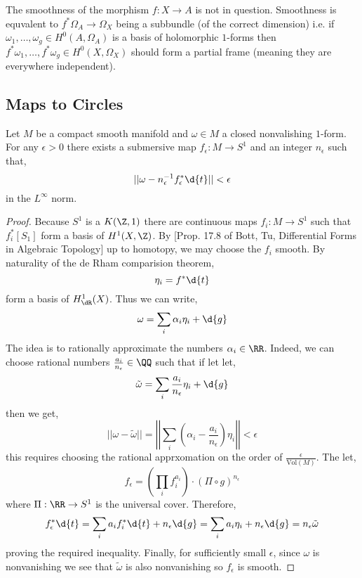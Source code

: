 \documentclass[12pt]{article}
\begin{document}
The smoothness of the morphism $f : X \to A$ is not in question. Smoothness is equvalent to $f^* \Omega_A \to \Omega_X$ being a subbundle (of the correct dimension) i.e. if $\omega_1, \dots, \omega_g \in H^0(A, \Omega_A)$ is a basis of holomorphic $1$-forms then $f^* \omega_1, \dots, f^* \omega_g \in H^0(X, \Omega_X)$ should form a partial frame (meaning they are everywhere independent). 


\subsection{Maps to Circles}

\begin{prop}
Let $M$ be a compact smooth manifold and $\omega \in M$ a closed nonvalishing $1$-form. For any $\epsilon > 0$ there exists a submersive map $f_\epsilon : M \to S^1$ and an integer $n_\epsilon$ such that,
\[ || \omega - n_\epsilon^{-1} f_\epsilon^* \d{t} || < \epsilon \]
in the $L^\infty$ norm.
\end{prop}

\begin{proof}
Because $S^1$ is a $K(\Z, 1)$ there are continuous maps $f_i : M \to S^1$ such that $f_i^* [S_1]$ form a basis of $H^1(X, \Z)$. By [Prop. 17.8 of Bott, Tu, Differential Forms in Algebraic Topology] up to homotopy, we may choose the $f_i$ smooth. By naturality of the de Rham comparision theorem, 
\[ \eta_i = f^* \d{t} \] 
form a basis of $H^1_{\dR}(X)$. Thus we can write,
\[ \omega = \sum_{i} \alpha_i \eta_i + \d{g} \]
The idea is to rationally approximate the numbers $\alpha_i \in \RR$. Indeed, we can choose rational numbers $\frac{a_i}{n_\epsilon} \in \QQ$ such that if let let,
\[ \tilde{\omega} = \sum_i \frac{a_i}{n_\epsilon} \eta_i  + \d{g} \]
then we get,
\[ || \omega - \tilde{\omega} || = \left| \left| \sum_i \left( \alpha_i - \frac{a_i}{n_\epsilon}  \right) \eta_i \right| \right| < \epsilon \]
this requires choosing the rational apprxomation on the order of $\frac{\epsilon}{\mathrm{Vol}(M)}$. The let,
\[ f_\epsilon = \left( \prod_i f_i^{a_i} \right) \cdot (\Pi \circ g)^{n_\epsilon} \]
where $\Pi : \RR \to S^1$ is the universal cover. Therefore, 
\[ f_\epsilon^* \d{t} = \sum_i a_i f_i^* \d{t} + n_\epsilon \d{g} = \sum_i a_i \eta_i + n_\epsilon \d{g} = n_\epsilon \tilde{\omega} \]
proving the required inequality. Finally, for sufficiently small $\epsilon$, since $\omega$ is nonvanishing we see that $\tilde{\omega}$ is also nonvanishing so $f_\epsilon$ is smooth. 
\end{proof}
\end{document}
